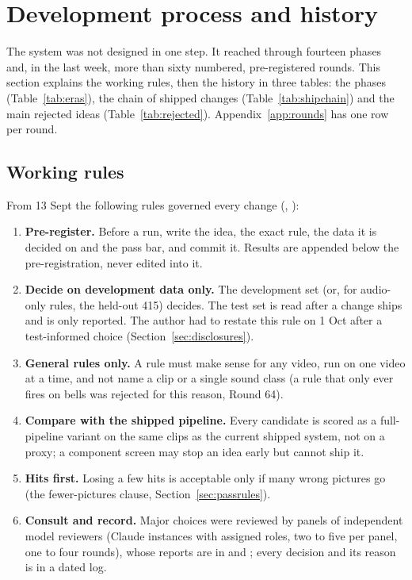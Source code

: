 \section{Development process and history}\label{sec:history}

The system was not designed in one step. It reached \Dp{} through fourteen phases and, in the last week, more
than sixty numbered, pre-registered rounds. This section explains the working rules, then the history in three
tables: the phases (Table~\ref{tab:eras}), the chain of shipped changes (Table~\ref{tab:shipchain}) and the main
rejected ideas (Table~\ref{tab:rejected}). Appendix~\ref{app:rounds} has one row per round.

\subsection{Working rules}\label{sec:rules}
From 13 Sept the following rules governed every change (,
):
\begin{enumerate}
  \item \textbf{Pre-register.} Before a run, write the idea, the exact rule, the data it is decided on and the pass
        bar, and commit it. Results are appended below the pre-registration, never edited into it.
  \item \textbf{Decide on development data only.} The development set (or, for audio-only rules, the held-out 415)
        decides. The test set is read after a change ships and is only reported. The author had to restate this rule
        on 1 Oct after a test-informed choice (Section~\ref{sec:disclosures}).
  \item \textbf{General rules only.} A rule must make sense for any video, run on one video at a time, and not name a
        clip or a single sound class (a rule that only ever fires on bells was rejected for this reason, Round 64).
  \item \textbf{Compare with the shipped pipeline.} Every candidate is scored as a full-pipeline variant on the same
        clips as the current shipped system, not on a proxy; a component screen may stop an idea early but cannot
        ship it.
  \item \textbf{Hits first.} Losing a few hits is acceptable only if many wrong pictures go (the fewer-pictures
        clause, Section~\ref{sec:passrules}).
  \item \textbf{Consult and record.} Major choices were reviewed by panels of independent model reviewers (Claude
        instances with assigned roles, two to five per panel, one to four rounds), whose reports are in
         and ; every decision and its reason is in a dated log.
\end{enumerate}

